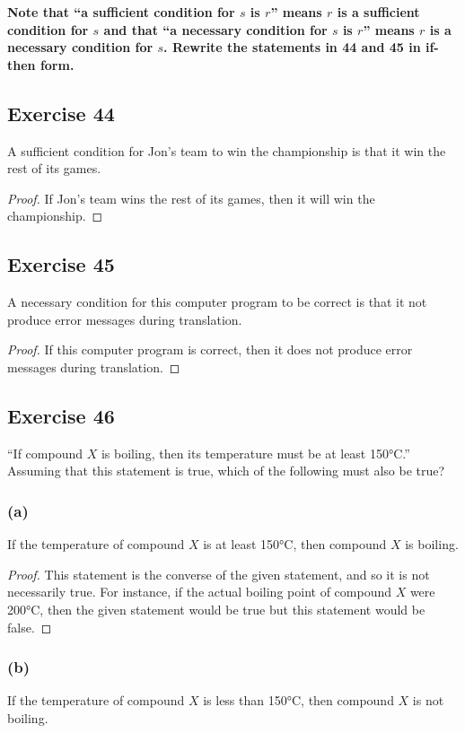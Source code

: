 \documentclass[14pt]{extarticle}
\begin{document}
{\bf Note that “a sufficient condition for $s$ is $r$” means $r$ is a sufficient condition for $s$ and that “a necessary condition for $s$ is $r$” means $r$ is a necessary condition for $s$. Rewrite the statements in 44 and 45 in if-then form.}

\subsection{Exercise 44}
A sufficient condition for Jon’s team to win the championship is that it win the rest of its games.

\begin{proof}
    If Jon’s team wins the rest of its games, then it will win the championship.
\end{proof}

\subsection{Exercise 45}
A necessary condition for this computer program to be correct is that it not produce error messages during translation.

\begin{proof}
    If this computer program is correct, then it does not produce error messages during translation.
\end{proof}

\subsection{Exercise 46}
“If compound $X$ is boiling, then its temperature must be at least 150°C.” Assuming that this statement is true, which of the following must also be true?

\subsubsection{(a)}
If the temperature of compound $X$ is at least 150°C, then compound $X$ is boiling.

\begin{proof}
    This statement is the converse of the given statement, and so it is not necessarily true. For instance, if the actual boiling point of compound $X$ were 200°C, then the given statement would be true but this statement would be false.
\end{proof}

\subsubsection{(b)}
If the temperature of compound $X$ is less than 150°C, then compound $X$ is not boiling.
\end{document}
